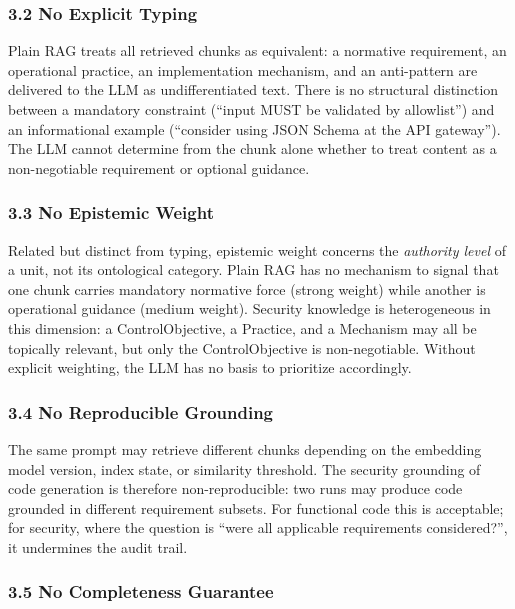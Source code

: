 \documentclass[
]{article}
\begin{document}
\subsubsection{3.2 No Explicit Typing}\label{no-explicit-typing}

Plain RAG treats all retrieved chunks as equivalent: a normative
requirement, an operational practice, an implementation mechanism, and
an anti-pattern are delivered to the LLM as undifferentiated text. There
is no structural distinction between a mandatory constraint (``input
MUST be validated by allowlist'') and an informational example
(``consider using JSON Schema at the API gateway''). The LLM cannot
determine from the chunk alone whether to treat content as a
non-negotiable requirement or optional guidance.

\subsubsection{3.3 No Epistemic Weight}\label{no-epistemic-weight}

Related but distinct from typing, epistemic weight concerns the
\emph{authority level} of a unit, not its ontological category. Plain
RAG has no mechanism to signal that one chunk carries mandatory
normative force (strong weight) while another is operational guidance
(medium weight). Security knowledge is heterogeneous in this dimension:
a ControlObjective, a Practice, and a Mechanism may all be topically
relevant, but only the ControlObjective is non-negotiable. Without
explicit weighting, the LLM has no basis to prioritize accordingly.

\subsubsection{3.4 No Reproducible
Grounding}\label{no-reproducible-grounding}

The same prompt may retrieve different chunks depending on the embedding
model version, index state, or similarity threshold. The security
grounding of code generation is therefore non-reproducible: two runs may
produce code grounded in different requirement subsets. For functional
code this is acceptable; for security, where the question is ``were all
applicable requirements considered?'', it undermines the audit trail.

\subsubsection{3.5 No Completeness
Guarantee}\label{no-completeness-guarantee}
\end{document}

